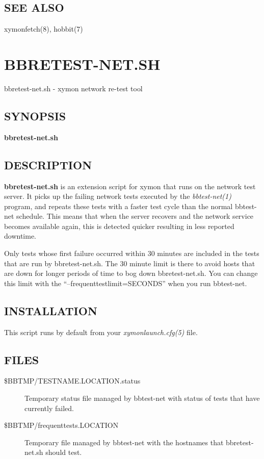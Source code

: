 \subsection{SEE ALSO}
xymonfetch(8), hobbit(7) 
  
%
\newpage
\section{BBRETEST-NET.SH}

 bbretest-net.sh - xymon network re-test tool

 \subsection{SYNOPSIS}
\textbf{bbretest-net.sh}


 
\subsection{DESCRIPTION}
\textbf{bbretest-net.sh}
 is an extension script for xymon that runs on the network test
 server. It picks up the failing network tests executed by the
 \emph{bbtest-net(1)} program, and repeats these tests with a faster
 test cycle than the normal bbtest-net schedule. This means that when
 the server recovers and the network service becomes available again,
 this is detected quicker resulting in less reported downtime. 


  Only tests whose first failure occurred within 30 minutes are
  included in the tests that are run by bbretest-net.sh. The 30 minute
  limit is there to avoid hosts that are down for longer periods of
  time to bog down bbretest-net.sh. You can change this limit with the
  ``--frequenttestlimit=SECONDS'' when you run bbtest-net. 



 


 
\subsection{INSTALLATION}
 This script runs by default from your \emph{xymonlaunch.cfg(5)}
 file. 

 


 
\subsection{FILES}
\begin{description}
\item[\$BBTMP/TESTNAME.LOCATION.status] Temporary status file managed
  by bbtest-net with status of tests that have currently failed. 

\item[\$BBTMP/frequenttests.LOCATION] Temporary file managed by
  bbtest-net with the hostnames that bbretest-net.sh should test. 


 


\end{description}
